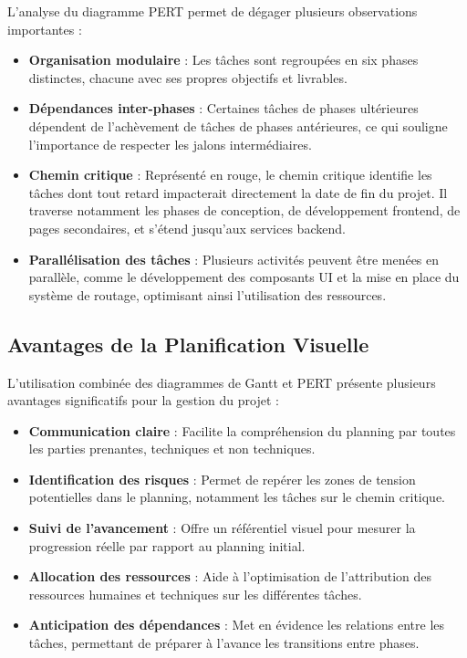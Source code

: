 L'analyse du diagramme PERT permet de dégager plusieurs observations importantes :

\begin{itemize}[leftmargin=*,noitemsep,topsep=0pt]
  \item \textbf{Organisation modulaire} : Les tâches sont regroupées en six phases distinctes, chacune avec ses propres objectifs et livrables.
  
  \item \textbf{Dépendances inter-phases} : Certaines tâches de phases ultérieures dépendent de l'achèvement de tâches de phases antérieures, ce qui souligne l'importance de respecter les jalons intermédiaires.
  
  \item \textbf{Chemin critique} : Représenté en rouge, le chemin critique identifie les tâches dont tout retard impacterait directement la date de fin du projet. Il traverse notamment les phases de conception, de développement frontend, de pages secondaires, et s'étend jusqu'aux services backend.
  
  \item \textbf{Parallélisation des tâches} : Plusieurs activités peuvent être menées en parallèle, comme le développement des composants UI et la mise en place du système de routage, optimisant ainsi l'utilisation des ressources.
\end{itemize}

\clearpage

\subsection{Avantages de la Planification Visuelle}

L'utilisation combinée des diagrammes de Gantt et PERT présente plusieurs avantages significatifs pour la gestion du projet :

\begin{itemize}[leftmargin=*,noitemsep,topsep=0pt]
  \item \textbf{Communication claire} : Facilite la compréhension du planning par toutes les parties prenantes, techniques et non techniques.
  
  \item \textbf{Identification des risques} : Permet de repérer les zones de tension potentielles dans le planning, notamment les tâches sur le chemin critique.
  
  \item \textbf{Suivi de l'avancement} : Offre un référentiel visuel pour mesurer la progression réelle par rapport au planning initial.
  
  \item \textbf{Allocation des ressources} : Aide à l'optimisation de l'attribution des ressources humaines et techniques sur les différentes tâches.
  
  \item \textbf{Anticipation des dépendances} : Met en évidence les relations entre les tâches, permettant de préparer à l'avance les transitions entre phases.
\end{itemize}


